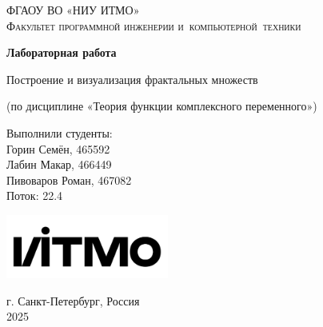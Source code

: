 \begin{titlepage}
    \begin{center}
        \large
        \textsc{ФГАОУ ВО «НИУ ИТМО»\\
        Факультет программной инженерии и~компьютерной~техники}
        \vspace*{4cm}
            
        \Huge
        \textbf{Лабораторная работа}
            
        \vspace{0.5cm}
        \LARGE
        Построение и визуализация фрактальных множеств
            
        \vspace{0.5cm}
        \large
        (по дисциплине «Теория функции комплексного переменного»)

        \vspace{1.5cm}

        \hfill\Large
        \begin{minipage}{.45\textwidth}
        Выполнили студенты:\\[2mm] 
        Горин Семён, 465592\\
        Лабин Макар, 466449\\
        Пивоваров Роман, 467082\\[2mm]
        Поток: 22.4
        \end{minipage}%
            
        \vfill
            
        \vspace{0.8cm}
            
        \includegraphics[width=0.4\textwidth]{itmo}
            
        \Large
        г. Санкт-Петербург, Россия\\
        2025
            
    \end{center}
\end{titlepage}